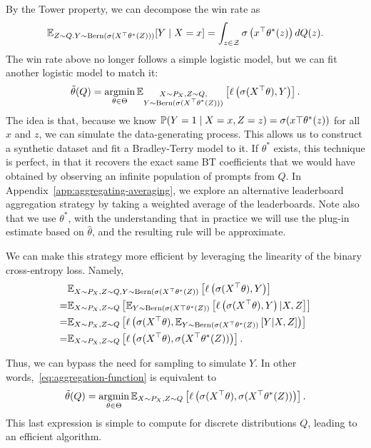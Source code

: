 By the Tower property, we can decompose the win rate as 
\begin{equation}
    \E_{Z \sim Q. Y \sim \mathrm{Bern}(\sigma(X^\top\theta^*(Z)))}[Y \mid X = x] = \int_{z \in \cZ} \sigma\left(x^\top \theta^*(z)\right) dQ(z).
\end{equation}
The win rate above no longer follows a simple logistic model, but we can fit another logistic model to match it:
\begin{equation}
\label{eq:aggregation-function}
\tilde\theta(Q) = \argmin_{\theta \in \Theta}  \E_{\substack{X \sim P_X, Z \sim Q, \\ Y\sim \mathrm{Bern}(\sigma(X^\top\theta^*(Z)))}} \left[  \ell\left(\sigma(X^\top \theta), Y\right) \right].
\end{equation}
The idea is that, because we know $\P(Y=1 \mid X=x, Z=z) = \sigma(x\top\theta^*(z))$ for all $x$ and $z$, we can simulate the data-generating process.
This allows us to construct a synthetic dataset and fit a Bradley-Terry model to it.
If $\theta^*$ exists, this technique is perfect, in that it recovers the exact same BT coefficients that we would have obtained by observing an infinite population of prompts from $Q$.
In Appendix~\ref{app:aggregating-averaging}, we explore an alternative leaderboard aggregation strategy by taking a weighted average of the leaderboards.
Note also that we use $\theta^*$, with the understanding that in practice we will use the plug-in estimate based on $\hat\theta$, and the resulting rule will be approximate.

We can make this strategy more efficient by leveraging the linearity of the binary cross-entropy loss.
Namely, 
\begin{align}
    & \E_{X \sim P_X, Z \sim Q, Y\sim \mathrm{Bern}(\sigma(X^\top\theta^*(Z))}\left[  \ell\left(\sigma(X^\top \theta), Y\right) \right] \\
    = &\E_{X \sim P_X, Z \sim Q}\left[ \E_{Y\sim \mathrm{Bern}(\sigma(X\top\theta^*(Z))} \left[\ell\left(\sigma(X^\top \theta), Y\right) | X, Z \right]\right] \\
    = &\E_{X \sim P_X, Z \sim Q}\left[\ell\left(\sigma(X^\top \theta), \E_{Y\sim \mathrm{Bern}(\sigma(X^\top\theta^*(Z))} \left[Y | X, Z\right] \right)\right] \\
    = &\E_{X \sim P_X, Z \sim Q}\left[\ell\left(\sigma(X^\top \theta), \sigma(X^\top\theta^*(Z)) \right)\right]. 
\end{align}

Thus, we can bypass the need for sampling to simulate $Y$.
In other words,~\eqref{eq:aggregation-function} is equivalent to
\begin{equation}
    \label{eq:efficient-aggregation-function}
    \tilde\theta(Q) = \argmin_{\theta \in \Theta}  \E_{X \sim P_X, Z \sim Q}\left[  \ell\left(\sigma(X^\top \theta), \sigma(X^\top \theta^*(Z))\right) \right].
\end{equation}
This last expression is simple to compute for discrete distributions $Q$, leading to an efficient algorithm.

